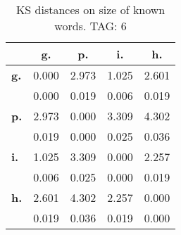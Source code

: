 \begin{table}[h!]
\begin{center}
\begin{tabular}{| l || c | c | c | c |}\hline
 & {\bf g.} & {\bf p.} & {\bf i.} & {\bf h.} \\\hline\hline
{\bf g.} & 0.000 & 2.973 & 1.025 & 2.601 \\
{\bf } & 0.000 & 0.019 & 0.006 & 0.019 \\\hline
{\bf p.} & 2.973 & 0.000 & 3.309 & 4.302 \\
{\bf } & 0.019 & 0.000 & 0.025 & 0.036 \\\hline
{\bf i.} & 1.025 & 3.309 & 0.000 & 2.257 \\
{\bf } & 0.006 & 0.025 & 0.000 & 0.019 \\\hline
{\bf h.} & 2.601 & 4.302 & 2.257 & 0.000 \\
{\bf } & 0.019 & 0.036 & 0.019 & 0.000 \\\hline
\end{tabular}
\caption{KS distances on size of known words. TAG: 6}
\end{center}
\end{table}